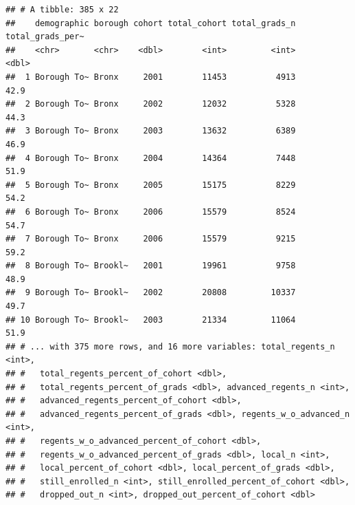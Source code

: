 \documentclass[
  english,
  man, fleqn, noextraspace]{apa6}
\newenvironment{Shaded}{\begin{snugshade}}{\end{snugshade}}
\newcommand{\DataTypeTok}[1]{\textcolor[rgb]{0.13,0.29,0.53}{#1}}
\newcommand{\DecValTok}[1]{\textcolor[rgb]{0.00,0.00,0.81}{#1}}
\newcommand{\KeywordTok}[1]{\textcolor[rgb]{0.13,0.29,0.53}{\textbf{#1}}}
\newcommand{\NormalTok}[1]{#1}
\newcommand{\OperatorTok}[1]{\textcolor[rgb]{0.81,0.36,0.00}{\textbf{#1}}}
\newcommand{\OtherTok}[1]{\textcolor[rgb]{0.56,0.35,0.01}{#1}}
\newcommand{\StringTok}[1]{\textcolor[rgb]{0.31,0.60,0.02}{#1}}
\begin{document}
\begin{Shaded}
\end{Shaded}

\begin{verbatim}
## # A tibble: 385 x 22
##    demographic borough cohort total_cohort total_grads_n total_grads_per~
##    <chr>       <chr>    <dbl>        <int>         <int>            <dbl>
##  1 Borough To~ Bronx     2001        11453          4913             42.9
##  2 Borough To~ Bronx     2002        12032          5328             44.3
##  3 Borough To~ Bronx     2003        13632          6389             46.9
##  4 Borough To~ Bronx     2004        14364          7448             51.9
##  5 Borough To~ Bronx     2005        15175          8229             54.2
##  6 Borough To~ Bronx     2006        15579          8524             54.7
##  7 Borough To~ Bronx     2006        15579          9215             59.2
##  8 Borough To~ Brookl~   2001        19961          9758             48.9
##  9 Borough To~ Brookl~   2002        20808         10337             49.7
## 10 Borough To~ Brookl~   2003        21334         11064             51.9
## # ... with 375 more rows, and 16 more variables: total_regents_n <int>,
## #   total_regents_percent_of_cohort <dbl>,
## #   total_regents_percent_of_grads <dbl>, advanced_regents_n <int>,
## #   advanced_regents_percent_of_cohort <dbl>,
## #   advanced_regents_percent_of_grads <dbl>, regents_w_o_advanced_n <int>,
## #   regents_w_o_advanced_percent_of_cohort <dbl>,
## #   regents_w_o_advanced_percent_of_grads <dbl>, local_n <int>,
## #   local_percent_of_cohort <dbl>, local_percent_of_grads <dbl>,
## #   still_enrolled_n <int>, still_enrolled_percent_of_cohort <dbl>,
## #   dropped_out_n <int>, dropped_out_percent_of_cohort <dbl>
\end{verbatim}
\end{document}
